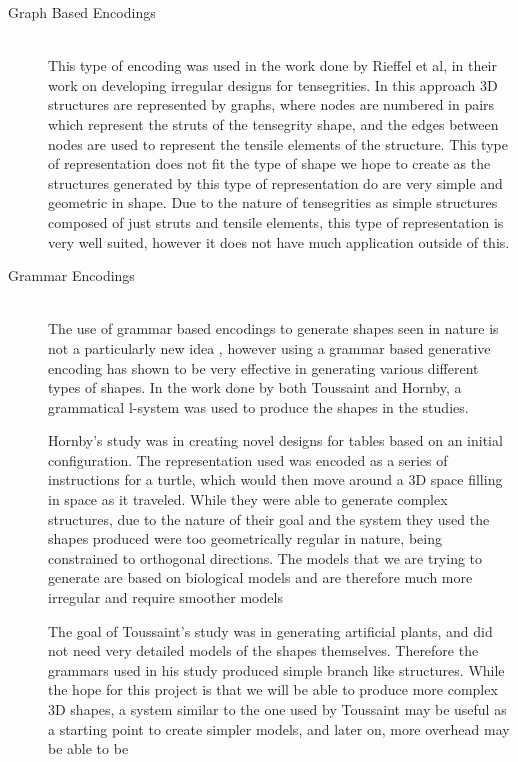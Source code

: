 \documentclass[condensed]{union-cs-thesis}
\begin{document}
\begin{description}
\item[Graph Based Encodings]\cite{rieffel2009automated} \\ 
This type of encoding was used in the work done by Rieffel
et al, in their work on developing irregular designs for tensegrities.  In this approach 3D structures are
represented by graphs, where nodes are numbered in pairs which represent the struts of the tensegrity shape, and the
edges between nodes are used to represent the tensile elements of the structure.  This type of representation does
not fit the type of shape we hope to create as the structures generated by this type of representation do are very
simple and geometric in shape.  Due to the nature of tensegrities as simple structures composed of just struts and
tensile elements, this type of representation is very well suited, however it does not have much application outside
of this.
\item[Grammar Encodings]\cite{toussaint2003demonstrating,hornby2004functional} \\
The use of grammar based encodings to generate shapes seen in nature is not a particularly new idea 
\cite{prusinkiewicz2012algorithmic},
however using a grammar based generative encoding has shown to be very effective in generating various different types
of shapes.  In the work done by both Toussaint and Hornby, a grammatical l-system was used to produce the shapes in
the studies.  
\par
Hornby's study was in creating novel designs for tables based on an initial configuration.  The representation used
was encoded as a series of instructions for a turtle, which would then move around a 3D space filling in space as it
traveled.  While they were able to generate complex structures, due to the nature of their goal and the system they used
the shapes produced were too geometrically regular in nature, being constrained to orthogonal directions.  The models that
we are trying to generate are based on biological models and are therefore much more irregular and require smoother models
\par
The goal of Toussaint's study was in generating artificial plants, and did not need very detailed models
of the shapes themselves.  Therefore the grammars used in his study produced simple branch like structures.  While the
hope for this project is that we will be able to produce more complex 3D shapes, a system similar to the one used by
Toussaint may be useful as a starting point to create simpler models, and later on, more overhead may be able to be

\end{description}
\end{document}
